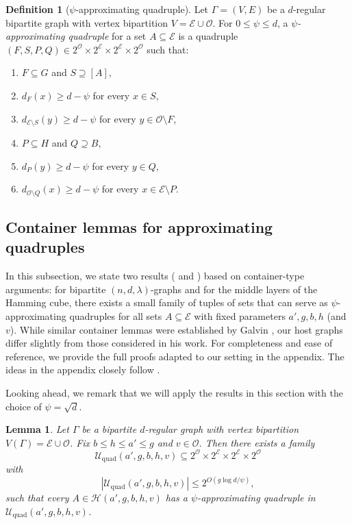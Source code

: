 \documentclass{amsart}
\newtheorem{lem}[thm]{Lemma}
\theoremstyle{definition}
\newtheorem{mydef}[thm]{Definition}
\newcommand{\cO}{\mathcal{O} }
\newcommand{\cE}{\mathcal{E} }
\newcommand{\0}[0]{\emptyset}
\begin{document}
\begin{mydef}[$\psi$-approximating quadruple]\label{def:psi-approx-quad}
Let $\Gamma=(V, E)$ be a $d$-regular bipartite graph with vertex bipartition $V=\cE \cup \cO$. For $0\leq\psi\leq d$, a \emph{$\psi$-approximating quadruple} for a set $A\subseteq \cE$ is a quadruple $(F,S,P,Q)\in 2^{\cO}\times 2^{\cE}\times 2^{\cE}\times 2^{\cO}$ such that:
\begin{enumerate}
\item $F\subseteq G$ and $S\supseteq [A]$,
\item $d_F(x)\ge d-\psi$ for every $x\in S$,
\item $d_{\cE\setminus S}(y)\ge d-\psi$ for every $y\in \cO\setminus F$,
\item $P\subseteq H$ and $Q\supseteq B$,
\item $d_P(y)\ge d-\psi$ for every $y\in Q$,
\item $d_{\cO\setminus Q}(x)\ge d-\psi$ for every $x\in \cE\setminus P$.
\end{enumerate}
\end{mydef}



\subsection{Container lemmas for approximating quadruples}

In this subsection, we state two results ( and ) based on container-type arguments: for bipartite $(n,d,\lambda)$-graphs and for the middle layers of the Hamming cube, 
there exists a small family of tuples of sets that can serve as $\psi$-approximating quadruples 
for all sets $A\subseteq \cE$ with fixed parameters $a',g,b,h$ (and $v$). 
While similar container lemmas were established by Galvin \cite{galvin2003homomorphisms}, our host graphs differ slightly from those considered in his work. For completeness and ease of reference, we provide the full proofs adapted to our setting in the appendix. The ideas in the appendix closely follow \cite{galvin2003homomorphisms, galvin2019independent}.

Looking ahead, we remark that we will apply the results in this section with the choice of $\psi = \sqrt{d}$.

\begin{lem}\label{prop:approx-quad-spectral-expander}
Let $\Gamma$ be a bipartite $d$-regular graph with vertex bipartition $V(\Gamma)=\cE\cup \cO$.
Fix $b\le h\le a'\le g$ and $v\in \cO$. Then there exists a family
\[
\mathcal U_{\mathrm{quad}}(a',g,b,h,v)\subseteq 2^{\cO}\times 2^{\cE}\times 2^{\cE}\times 2^{\cO}
\]
with
\[
|\mathcal U_{\mathrm{quad}}(a',g,b,h,v)|
\le
2^{O(g\log d/\psi)},
\]
such that every $A\in \mathcal H(a',g,b,h,v)$ has a $\psi$-approximating quadruple in $\mathcal U_{\mathrm{quad}}(a',g,b,h,v)$.
\end{lem}
\end{document}
